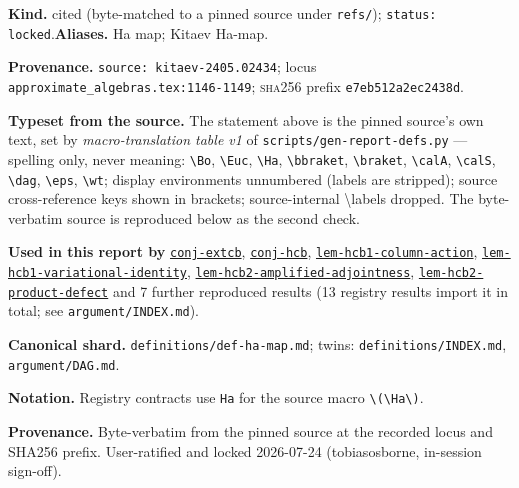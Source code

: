 \begin{defnote}
\textbf{Kind.} cited (byte-matched to a pinned source under \texttt{refs/}); \texttt{status: locked}.\quad\textbf{Aliases.} Ha map; Kitaev Ha-map.
\par
\textbf{Provenance.} \texttt{source: kitaev-\allowbreak{}2405.\allowbreak{}02434}; locus \texttt{approximate\_algebras.\allowbreak{}tex:\allowbreak{}1146-\allowbreak{}1149}; \textsc{sha256} prefix \texttt{e7eb512a2ec2438d}.
\par
\textbf{Typeset from the source.} The statement above is the pinned source's own text, set by \emph{macro-translation table v1} of \texttt{scripts/gen-report-defs.py} --- spelling only, never meaning: \texttt{\textbackslash{}Bo}, \texttt{\textbackslash{}Euc}, \texttt{\textbackslash{}Ha}, \texttt{\textbackslash{}bbraket}, \texttt{\textbackslash{}braket}, \texttt{\textbackslash{}calA}, \texttt{\textbackslash{}calS}, \texttt{\textbackslash{}dag}, \texttt{\textbackslash{}eps}, \texttt{\textbackslash{}wt}; display environments unnumbered (labels are stripped); source cross-reference keys shown in brackets; source-internal \textbackslash{}labels dropped. The byte-verbatim source is reproduced below as the second check.
\par
\textbf{Used in this report by} \hyperref[conj:extcb]{\texttt{conj-\allowbreak{}extcb}}, \hyperref[conj:hcb]{\texttt{conj-\allowbreak{}hcb}}, \hyperref[lem:hcb1-column-action]{\texttt{lem-\allowbreak{}hcb1-\allowbreak{}column-\allowbreak{}action}}, \hyperref[lem:hcb1-variational-identity]{\texttt{lem-\allowbreak{}hcb1-\allowbreak{}variational-\allowbreak{}identity}}, \hyperref[lem:hcb2-amplified-adjointness]{\texttt{lem-\allowbreak{}hcb2-\allowbreak{}amplified-\allowbreak{}adjointness}}, \hyperref[lem:hcb2-product-defect]{\texttt{lem-\allowbreak{}hcb2-\allowbreak{}product-\allowbreak{}defect}} and 7 further reproduced results (13 registry results import it in total; see \texttt{argument/INDEX.md}).
\par
\textbf{Canonical shard.} \texttt{definitions/\allowbreak{}def-\allowbreak{}ha-\allowbreak{}map.\allowbreak{}md}; twins: \texttt{definitions/INDEX.md}, \texttt{argument/DAG.md}.
\par
\textbf{Notation.} Registry contracts use \texttt{Ha} for the source macro \texttt{\textbackslash{}(\textbackslash{}Ha\textbackslash{})}.

\textbf{Provenance.} Byte-verbatim from the pinned source at the recorded locus and
SHA256 prefix.  User-ratified and locked 2026-07-24 (tobiasosborne, in-session sign-off).
\end{defnote}
